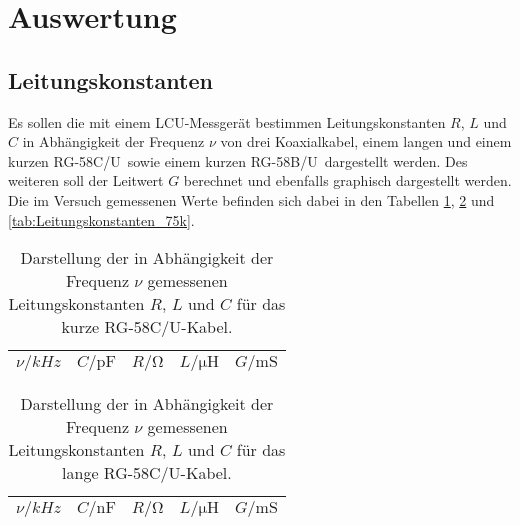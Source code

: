 

\newcommand{\CU}{RG-58C/U}
\newcommand{\BU}{RG-58B/U}


\section{Auswertung}

\subsection{Leitungskonstanten}
\label{sub:leitungskonstanten}

Es sollen die mit einem LCU-Messgerät bestimmen Leitungskonstanten
$R$, $L$ und $C$ in Abhängigkeit der Frequenz $\nu$ von drei Koaxialkabel,
einem langen und einem kurzen \CU\ sowie einem kurzen \BU\ dargestellt werden.
Des weiteren soll der Leitwert $G$ berechnet und ebenfalls graphisch
dargestellt werden.
Die im Versuch gemessenen Werte befinden sich dabei in den Tabellen
\ref{tab:Leitungskonstanten_50k}, \ref{tab:Leitungskonstanten_50l} und
\ref{tab:Leitungskonstanten_75k}.

\begin{table}[htpb]
	\centering
	\begin{tabular}{ccccc}
		\midrule
		\midrule
		$\nu / \si{kHz}$        & $C / \si{\pico\farad}$     & $R / \si{\ohm}$ &
		$L / \si{\micro\henry}$ & $G / \si{\milli\siemens}$ \\
		\midrule
		
		\midrule
		\midrule
	\end{tabular}
	\caption{Darstellung der in Abhängigkeit der Frequenz $\nu$ gemessenen
		Leitungskonstanten $R$, $L$ und $C$ für das kurze \CU-Kabel.}
\label{tab:Leitungskonstanten_50k}
\end{table}

\begin{table}[htpb]
	\centering
	\begin{tabular}{ccccc}
		\midrule
		\midrule
		$\nu / \si{kHz}$        & $C / \si{\nano\farad}$     & $R / \si{\ohm}$ &
		$L / \si{\micro\henry}$ & $G / \si{\milli\siemens}$ \\
		\midrule
		
		\midrule
		\midrule
	\end{tabular}
	\caption{Darstellung der in Abhängigkeit der Frequenz $\nu$ gemessenen
		Leitungskonstanten $R$, $L$ und $C$ für das lange \CU-Kabel.}
\label{tab:Leitungskonstanten_50l}
\end{table}

